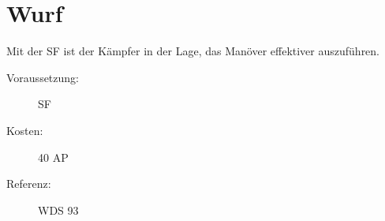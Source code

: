 \section{Wurf}
\label{sf.wurf}
Mit der SF  ist der Kämpfer in der Lage, das Manöver  effektiver auszuführen.
\begin{description}
    \item[Voraussetzung:]
        SF 
    \item [Kosten:]
        40 AP
    \item [Referenz:]
        WDS 93
\end{description}
